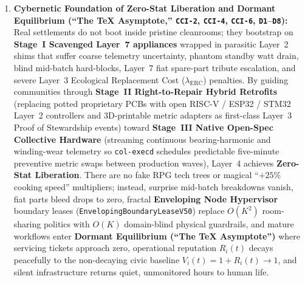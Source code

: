 \begin{enumerate}
        templates across the \textbf{Three Sovereign Content-Addressed JSON-LD Libraries}
        replicated over Layer~3 (\textit{The Ontological Graph}
        \texttt{collective:OntologicalArtifactGraph}, \textit{The Orchestration Registry}
        \texttt{collective:ParameterizedBpmnTemplate}, and \textit{The Physics Baseline}
        \texttt{collective:ThermodynamicBenchmarkLedger} /
        \texttt{collective:thermodynamicProof}). Through four instantiation modes---\textit{Turnkey
        Instantiation}, \textit{Localized Semantic Forking} (\texttt{prov:wasDerivedFrom}),
        \textit{Empirical Lineage Ranking} via signed \texttt{collective:thermodynamicProof}
        batch telemetry, and \textit{Greenfield Montage} (reserving $15\%$ of schedule capacity
        for unrequested creative experiments alongside $85\%$ verified neighborhood
        staples, \texttt{D4})---paired with Layer~4's \textbf{3-Tier BPMN Hardware Adaptation
        Cascade} (\textit{Tier~1: Automatic SI Parameter Scaling} $\to$ \textit{Tier~2:
        Macro-Activity Substitution} $\to$ \textit{Tier~3: True-Constraint Hard-Block}), a new
        settlement node achieves day-one physical competence even on heterogeneous improvised
        equipment.
\item \textbf{Cybernetic Foundation of Zero-Stat Liberation and Dormant Equilibrium (``The \TeX{} Asymptote,'' \texttt{CCI-2}, \texttt{CCI-4}, \texttt{CCI-6}, \texttt{D1}--\texttt{D8}):}
        Real settlements do not boot inside pristine cleanrooms; they bootstrap on
        \textbf{Stage~I Scavenged Layer~7 appliances} wrapped in parasitic Layer~2 shims that
        suffer coarse telemetry uncertainty, phantom standby watt drain, blind mid-batch
        hard-blocks, Layer~7 fiat spare-part tribute escalation, and severe Layer~3 Ecological
        Replacement Cost ($\lambda_{\mathrm{ERC}}$) penalties. By guiding communities through
        \textbf{Stage~II Right-to-Repair Hybrid Retrofits} (replacing potted proprietary PCBs
        with open RISC-V / ESP32 / STM32 Layer~2 controllers and 3D-printable metric adapters as
        first-class Layer~3 Proof of Stewardship events) toward \textbf{Stage~III Native
        Open-Spec Collective Hardware} (streaming continuous bearing-harmonic and winding-wear
        telemetry so \texttt{col-execd} schedules predictable five-minute preventive metric swaps
        between production waves), Layer~4 achieves \textbf{Zero-Stat Liberation}. There are no
        fake RPG tech trees or magical ``$+25\%$ cooking speed'' multipliers; instead, surprise
        mid-batch breakdowns vanish, fiat parts bleed drops to zero, fractal \textbf{Enveloping
        Node Hypervisor} boundary leases (\texttt{EnvelopingBoundaryLeaseV50}) replace $O(K^2)$
        room-sharing politics with $O(K)$ domain-blind physical guardrails, and mature workflows
        enter \textbf{Dormant Equilibrium (``The \TeX{} Asymptote'')} where servicing tickets
        approach zero, operational reputation $R_i(t)$ decays peacefully to the non-decaying
        civic baseline $V_i(t) = 1 + R_i(t) \to 1$, and silent infrastructure returns quiet,
        unmonitored hours to human life.
\end{enumerate}

